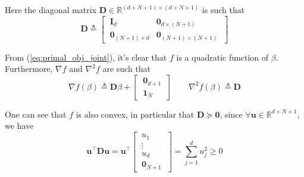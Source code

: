 \documentclass{article}
\numberwithin{equation}{section}
\newcommand{\coomatrix}{%
    \href{%
        https://docs.scipy.org/doc/scipy/reference/generated/%
        scipy.sparse.coo_matrix.html%
    }{\texttt{scipy.sparse.coo\_matrix}}%
}
\begin{document}
Here the diagonal matrix $ \mathbf{D} \in \mathbb{R}^{(d + N + 1) \times
(d + N + 1)} $ is such that
\begin{equation}
    \mathbf{D} \triangleq \begin{bmatrix}
        \ \mathbf{I}_d & \mathbf{0}_{d \times (N + 1)} \ \\
        \ \mathbf{0}_{(N + 1) \times d} & \mathbf{0}_{(N + 1) \times (N + 1)} \
    \end{bmatrix}
\end{equation}

From (\ref{eq:primal_obj_joint}), it's clear that $ f $ is a quadratic function
of $ \beta $. Furthermore, $ \nabla f $ and $ \nabla^2 f $ are such that
\begin{equation*}
    \nabla f(\beta) \triangleq \mathbf{D}\beta + \begin{bmatrix}
        \ \mathbf{0}_{d + 1} \ \\ \ \mathbf{1}_N \
    \end{bmatrix} \quad\quad \nabla^2f(\beta) \triangleq \mathbf{D}
\end{equation*}

One can see that $ f $ is also convex, in particular that $ \mathbf{D} \succeq
\mathbf{0} $, since $ \forall \mathbf{u} \in \mathbb{R}^{d + N + 1} $, we have
\begin{equation*}
    \mathbf{u}^\top\mathbf{D}\mathbf{u} = \mathbf{u}^\top\begin{bmatrix}
        \ u_1 \ \\ \ \vdots \ \\ \ u_d \ \\ \ \mathbf{0}_{N + 1} \
    \end{bmatrix} = \sum_{j = 1}^du_j^2 \ge 0
\end{equation*}




\end{document}
